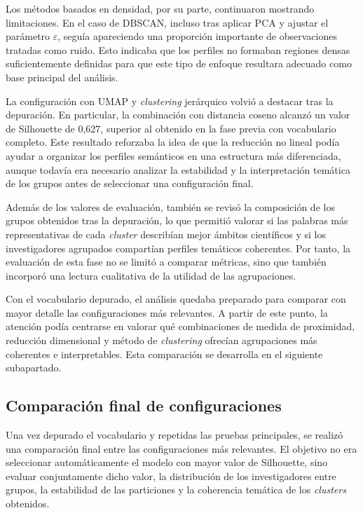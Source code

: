 \documentclass[11pt,spanish,listoffigures,listoftables]{tfgetsinf}
\begin{document}
Los métodos basados en densidad, por su parte, continuaron mostrando limitaciones. En el caso de DBSCAN, incluso tras aplicar PCA y ajustar el parámetro \(\varepsilon\), seguía apareciendo una proporción importante de observaciones tratadas como ruido. Esto indicaba que los perfiles no formaban regiones densas suficientemente definidas para que este tipo de enfoque resultara adecuado como base principal del análisis.

La configuración con UMAP y \textit{clustering} jerárquico volvió a destacar tras la depuración. En particular, la combinación con distancia coseno alcanzó un valor de Silhouette de 0,627, superior al obtenido en la fase previa con vocabulario completo. Este resultado reforzaba la idea de que la reducción no lineal podía ayudar a organizar los perfiles semánticos en una estructura más diferenciada, aunque todavía era necesario analizar la estabilidad y la interpretación temática de los grupos antes de seleccionar una configuración final.

Además de los valores de evaluación, también se revisó la composición de los grupos obtenidos tras la depuración, lo que permitió valorar si las palabras más representativas de cada \textit{cluster} describían mejor ámbitos científicos y si los investigadores agrupados compartían perfiles temáticos coherentes. Por tanto, la evaluación de esta fase no se limitó a comparar métricas, sino que también incorporó una lectura cualitativa de la utilidad de las agrupaciones.

Con el vocabulario depurado, el análisis quedaba preparado para comparar con mayor detalle las configuraciones más relevantes. A partir de este punto, la atención podía centrarse en valorar qué combinaciones de medida de proximidad, reducción dimensional y método de \textit{clustering} ofrecían agrupaciones más coherentes e interpretables. Esta comparación se desarrolla en el siguiente subapartado.

\subsection{Comparación final de configuraciones}

Una vez depurado el vocabulario y repetidas las pruebas principales, se realizó una comparación final entre las configuraciones más relevantes. El objetivo no era seleccionar automáticamente el modelo con mayor valor de Silhouette, sino evaluar conjuntamente dicho valor, la distribución de los investigadores entre grupos, la estabilidad de las particiones y la coherencia temática de los \textit{clusters} obtenidos.
\end{document}
